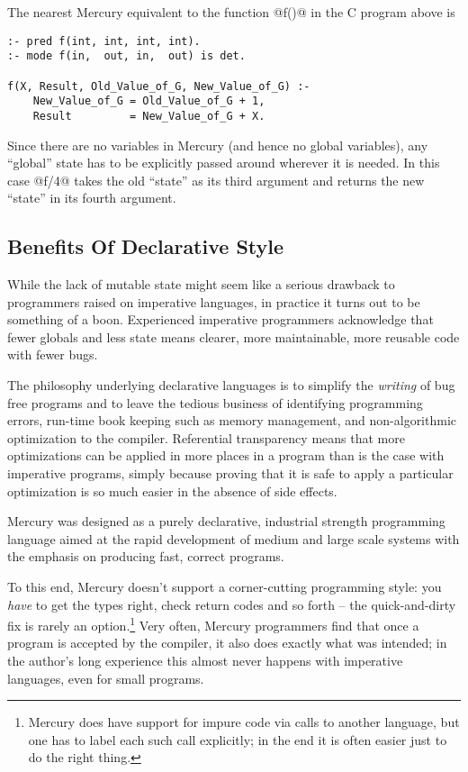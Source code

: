 The nearest Mercury equivalent to the function @f()@ in the C
program above is

\begin{verbatim}
:- pred f(int, int, int, int).
:- mode f(in,  out, in,  out) is det.

f(X, Result, Old_Value_of_G, New_Value_of_G) :-
    New_Value_of_G = Old_Value_of_G + 1,
    Result         = New_Value_of_G + X.
\end{verbatim}

Since there are no variables in Mercury (and hence no global
variables), any ``global'' state has to be explicitly passed
around wherever it is needed.  In this case @f/4@ takes the old
``state'' as its third argument and returns the new ``state'' in
its fourth argument.

\subsection{Benefits Of Declarative Style}

While the lack of mutable state might seem like a serious
drawback to programmers raised on imperative languages, in
practice it turns out to be something of a boon.  Experienced
imperative programmers acknowledge that fewer globals and less
state means clearer, more maintainable, more reusable code
with fewer bugs.

The philosophy underlying declarative languages is to simplify the
\emph{writing} of bug free programs and to leave the tedious
business of identifying programming errors, run-time book
keeping such as memory management, and non-algorithmic
optimization to the compiler.  Referential transparency means
that more optimizations can be applied in more places in a
program than is the case with imperative programs, simply
because proving that it is safe to apply a particular
optimization is so much easier in the absence of side effects.

Mercury was designed as a purely declarative, industrial
strength programming language aimed at the rapid development
of medium and large scale systems with the emphasis on
producing fast, correct programs.

To this end, Mercury doesn't support a corner-cutting
programming style: you \emph{have} to get the types right, check
return codes and so forth -- the quick-and-dirty fix is rarely
an option.\footnote{Mercury does have support for impure code
via calls to another language, but one has to label each such
call explicitly; in the end it is often easier just to do the
right thing.}  Very often, Mercury programmers find that once
a program is accepted by the compiler, it also does exactly
what was intended; in the author's long experience this almost
never happens with imperative languages, even for small
programs.

